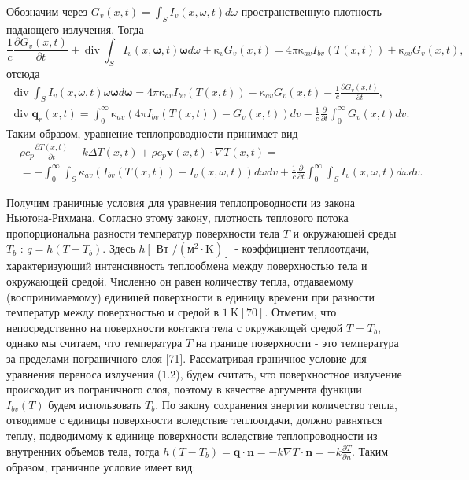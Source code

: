 Обозначим через $G_{v}(x, t)=\int_{S} I_{v}(x, \omega, t) d \omega$
пространственную плотность падающего излучения.
Тогда
\[
    \frac{1}{c} \frac{\partial G_{v}(x, t)}{\partial t}
    +\operatorname{div} \int_{S} I_{v}(x, \boldsymbol{\omega}, t)
    \boldsymbol{\omega} d \omega+\mathrm{\kappa}_{v} G_{v}(x, t)=4 \pi
    \mathrm{\kappa}_{a v} I_{b v}(T(x, t))+\mathrm{\kappa}_{s v} G_{v}(x, t),
\]
отсюда
\[
    \begin{gathered}
        \operatorname{div} \int_{S} I_{v}(x, \omega, t) \omega \boldsymbol{\omega} d
        \boldsymbol{\omega}=4 \pi \mathrm{\kappa}_{a v} I_{b v}(T(x, t))-\mathrm{\kappa}_{a v}
        G_{v}(x, t)-\frac{1}{c} \frac{\partial G_{v}(x, t)}{\partial t}, \\
        \operatorname{div} \mathbf{q}_{r}(x, t)=\int_{0}^{\infty} \mathrm{\kappa}_{a v}
        \left(4 \pi I_{b v}(T(x, t))-G_{v}(x, t)\right) d v-\frac{1}{c}
        \frac{\partial}{\partial t} \int_{0}^{\infty} G_{v}(x, t) d v.
    \end{gathered}
\]
Таким образом, уравнение теплопроводности принимает вид
\[
    \begin{aligned}
        &\rho c_{p} \frac{\partial T(x, t)}{\partial t}
        -k \Delta T(x, t)+\rho c_{p} \mathbf{v}(x, t) \cdot \nabla T(x, t)= \\
        &=-\int_{0}^{\infty} \int_{S} \kappa_{a v}
        \left(I_{b v}(T(x, t))-I_{v}(x, \omega, t)\right) d \omega d v
        +\frac{1}{c} \frac{\partial}{\partial t}
        \int_{0}^{\infty} \int_{S} I_{v}(x, \omega, t) d \omega d v.
    \end{aligned}
\]

Получим граничные условия для уравнения теплопроводности из закона Ньютона-Рихмана.
Согласно этому закону, плотность теплового потока пропорциональна разности температур
поверхности тела $T$ и окружающей среды $T_{b}$ : $q=h\left(T-T_{b}\right)$.
Здесь $h\left[\right.$ Вт $\left./\left(\mathrm{м}^{2} \cdot \mathrm{K}\right)\right]$ - коэффициент
теплоотдачи, характеризующий интенсивность теплообмена между поверхностью тела и окружающей средой.
Численно он равен количеству тепла, отдаваемому (воспринимаемому) единицей поверхности в единицу времени
при разности температур между поверхностью и средой в $1 \mathrm{~K}[70]$.
Отметим, что непосредственно
на поверхности контакта тела с окружающей средой $T=T_{b}$,
однако мы считаем, что температура $T$ на
границе поверхности - это температура за пределами пограничного слоя [71].
Рассматривая граничное условие для уравнения переноса излучения (1.2),
будем считать, что поверхностное излучение происходит из пограничного слоя,
поэтому в качестве аргумента функции $I_{b v}(T)$ будем использовать $T_{b}$.
По закону сохранения энергии количество тепла, отводимое с единицы поверхности
вследствие теплоотдачи, должно равняться теплу, подводимому к единице поверхности
вследствие теплопроводности из внутренних объемов тела, тогда
$h\left(T-T_{b}\right)=\mathbf{q} \cdot \mathbf{n} =
-k \nabla T \cdot \mathbf{n}=-k \frac{\partial T}{\partial n}$.
Таким образом, граничное условие имеет вид:

